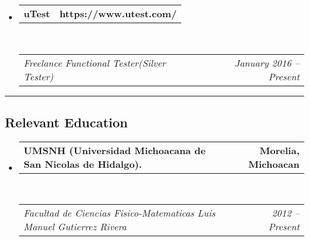 \documentclass[10pt,letterpaper]{article}
\makeatletter
\newcommand{\headerrow}[2]
{\begin{tabular*}{\linewidth}{l@{\extracolsep{\fill}}r}
	#1 &
	#2 \\
\end{tabular*}}
\makeatother
\begin{document}
\begin{itemize}
    \item
	\headerrow
		{\textbf{uTest}}
		{\textbf{https://www.utest.com/}}
	\\
	\headerrow
		{\emph{Freelance Functional Tester(Silver Tester)}}
		{\emph{January 2016 -- Present}}

\end{itemize}


\hrule
\vspace{-0.4em}
\subsection*{Relevant Education}

\begin{itemize}
	\parskip=0.1em

	\item 
	\headerrow
		{\textbf{UMSNH (Universidad Michoacana de San Nicolas de Hidalgo).}}
		{\textbf{Morelia, Michoacan}}
	\\
	\headerrow
		{\emph{Facultad de Ciencias Fisico-Matematicas Luis Manuel Gutierrez Rivera}}
		{\emph{2012 -- Present}}

\end{itemize}
\end{document}
